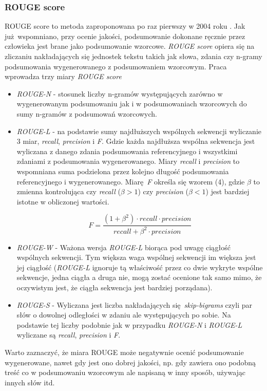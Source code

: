 \documentclass{article}
\begin{document}
\subsubsection{ROUGE score}
ROUGE score to metoda zaproponowana po raz pierwszy w 2004 roku \cite{lin2004rouge}. Jak już wspomniano,
przy ocenie jakości, podsumowanie dokonane ręcznie przez człowieka jest brane jako podsumowanie
wzorcowe. \textit{ROUGE score} opiera się na zliczaniu nakładających się jednostek tekstu takich jak
słowa, zdania czy n-gramy podsumowania wygenerowanego z podsumowaniem wzorcowym. Praca \cite{lin2004rouge}
wprowadza trzy miary \textit{ROUGE score}
\begin{itemize}
	\item \textit{ROUGE-N} - stosunek liczby n-gramów występujących zarówno w wygenerowanym podsumowaniu jak i w 
		podsumowaniach wzorcowych do sumy n-gramów z podsumowań wzorcowych.
	\item \textit{ROUGE-L} - na podstawie sumy najdłuższych wspólnych sekwencji wyliczanie 3 miar, 
		\textit{recall}, \textit{precision} i \textit{F}. Gdzie każda najdłuższa wspólna sekwencja jest
		wyliczana z danego zdania podsumowania referencyjnego i wszystkimi zdaniami z podsumowania wygenerowanego.
		Miary \textit{recall} i \textit{precision} to wspomniana suma podzielona przez kolejno długość podsumowania
		referencyjnego i wygenerowanego. Miarę \textit{F} określa się wzorem (4), gdzie $\beta$ to zmienna 
		kontrolująca czy \textit{recall} ($\beta > 1$) czy \textit{precision} ($\beta < 1$) jest bardziej 
		istotne w obliczonej wartości.
		\begin{center}
			\begin{equation}
				F = \frac{(1 + \beta^2) \cdot recall\cdot precision}{recall + \beta^2 \cdot precision}
			\end{equation}
		\end{center}
	\item \textit{ROUGE-W} - Ważona wersja \textit{ROUGE-L} biorąca pod uwagę
		ciągłość wspólnych sekwencji. Tym większa waga wspólnej sekwencji im większa jest jej ciągłość (\textit{ROUGE-L} ignoruje tą właściwość przez co dwie
		wykryte wspólne sekwencje, jedna ciągła a druga nie, mogą zostać ocenione
		tak samo mimo, że oczywistym jest, że ciągła sekwencja jest bardziej
		porządana).
	\item \textit{ROUGE-S} - Wyliczana jest liczba nakładających się \textit{skip-bigrams} 
		czyli par słów o dowolnej odległości w zdaniu ale występujących po sobie. Na podstawie tej 
		liczby podobnie jak w przypadku \textit{ROUGE-N} i \textit{ROUGE-L} wyliczane są
		\textit{recall}, \textit{precision} i \textit{F}.
\end{itemize}
Warto zaznaczyć, że miara ROUGE może negatywnie ocenić podsumowanie wygenerowane,
nawet gdy jest ono dobrej jakości, np. gdy zawiera ono podobną treść
co w podsumowaniu wzorcowym ale napisaną w inny sposób, używając innych słów itd.
\end{document}
